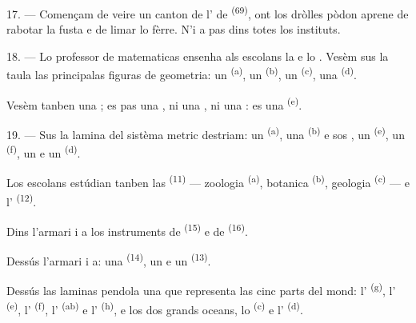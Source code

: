 17. --- Començam de veire un canton de l' de  \textsuperscript{(69)}, ont los dròlles pòdon aprene de rabotar la fusta
e de limar lo fèrre. N'i a pas dins totes los instituts.

\VUsaut{5.0mm}
\VUsaut{3.6mm}

18. --- Lo professor de matematicas ensenha als escolans la  e lo . Vesèm sus la taula las
principalas figuras de geometria: un  \textsuperscript{(a)}, un
 \textsuperscript{(b)}, un 
\textsuperscript{(c)}, una  \textsuperscript{(d)}.

Vesèm tanben una ; es pas una , ni una
, ni una : es una 
\textsuperscript{(e)}.

19. --- Sus la lamina del sistèma metric destriam: un 
\textsuperscript{(a)}, una  \textsuperscript{(b)} e sos
, un  \textsuperscript{(e)}, un 
\textsuperscript{(f)}, un  e un 
\textsuperscript{(d)}.

Los escolans estúdian tanben las 
\textsuperscript{(11)} --- zoologia \textsuperscript{(a)}, botanica
\textsuperscript{(b)}, geologia \textsuperscript{(c)} --- e l'
\textsuperscript{(12)}.

Dins l'armari i a los instruments de  \textsuperscript{(15)} e de
 \textsuperscript{(16)}.

Dessús l'armari i a: una  \textsuperscript{(14)}, un 
e un  \textsuperscript{(13)}.

Dessús las laminas pendola una  que representa las cinc parts del
mond: l' \textsuperscript{(g)}, l'
\textsuperscript{(e)}, l' \textsuperscript{(f)},
l' \textsuperscript{(ab)} e l'
\textsuperscript{(h)}, e los dos grands oceans, lo 
\textsuperscript{(c)} e l' \textsuperscript{(d)}.
\VUsaut{6.0mm}
\VUfilet{22mm}
